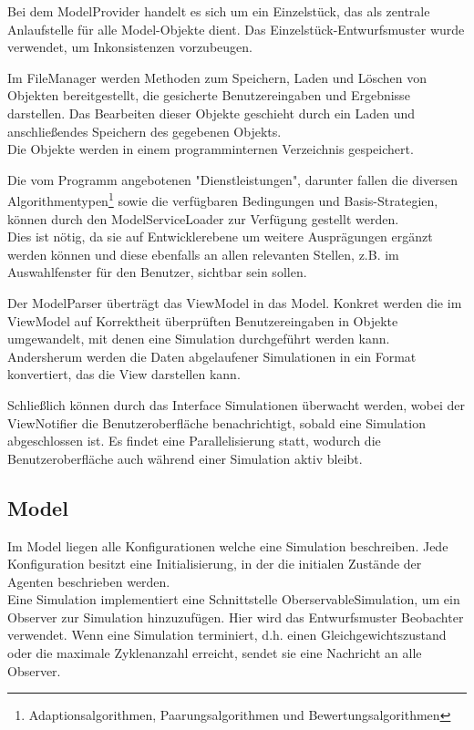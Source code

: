 Bei dem ModelProvider handelt es sich um ein Einzelstück, das als zentrale Anlaufstelle für alle Model-Objekte dient. Das Einzelstück-Entwurfsmuster wurde verwendet, um Inkonsistenzen vorzubeugen.

Im FileManager werden Methoden zum Speichern, Laden und Löschen von Objekten bereitgestellt, die gesicherte Benutzereingaben und Ergebnisse darstellen. Das Bearbeiten dieser Objekte geschieht durch ein Laden und anschließendes Speichern des gegebenen Objekts.\\
Die Objekte werden in einem programminternen Verzeichnis gespeichert.

Die vom Programm angebotenen "Dienstleistungen", darunter fallen die diversen Algorithmentypen\footnote{Adaptionsalgorithmen, Paarungsalgorithmen und Bewertungsalgorithmen} sowie die verfügbaren Bedingungen und Basis-Strategien, können durch den ModelServiceLoader zur Verfügung gestellt werden.\\
Dies ist nötig, da sie auf Entwicklerebene um weitere Ausprägungen ergänzt werden können und diese ebenfalls an allen relevanten Stellen, z.B. im Auswahlfenster für den Benutzer, sichtbar sein sollen.

Der ModelParser überträgt das ViewModel in das Model. Konkret werden die im ViewModel auf Korrektheit überprüften Benutzereingaben in Objekte umgewandelt, mit denen eine Simulation durchgeführt werden kann. Andersherum werden die Daten abgelaufener Simulationen in ein Format konvertiert, das die View darstellen kann.

Schließlich können durch das Interface Simulationen überwacht werden, wobei der ViewNotifier die Benutzeroberfläche benachrichtigt, sobald eine Simulation abgeschlossen ist. Es findet eine Parallelisierung statt, wodurch die Benutzeroberfläche auch während einer Simulation aktiv bleibt.

\subsection{Model}

\noindent
{}

Im Model liegen alle Konfigurationen welche eine Simulation beschreiben. Jede Konfiguration besitzt eine Initialisierung, in der die initialen Zustände der Agenten beschrieben werden. \\

Eine Simulation implementiert eine Schnittstelle OberservableSimulation, um ein Observer zur Simulation hinzuzufügen. Hier wird das Entwurfsmuster Beobachter verwendet. Wenn eine Simulation terminiert, d.h. einen Gleichgewichtszustand oder die maximale Zyklenanzahl erreicht, sendet sie eine Nachricht an alle Observer.\\

